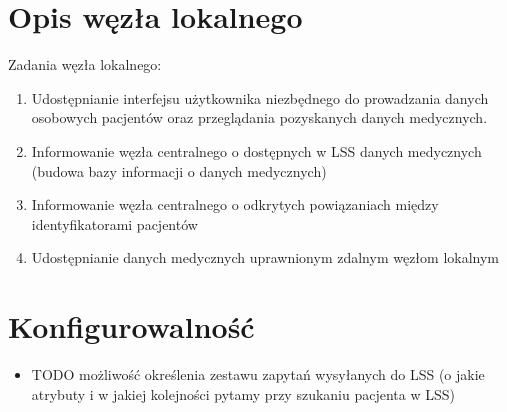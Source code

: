 \documentclass[a4paper]{report}
\begin{document}
\section{Opis węzła lokalnego}
Zadania węzła lokalnego:
  \begin{enumerate}
    \item Udostępnianie interfejsu użytkownika niezbędnego do prowadzania danych osobowych pacjentów
          oraz przeglądania pozyskanych danych medycznych.
    \item Informowanie węzła centralnego o dostępnych w LSS danych medycznych (budowa bazy informacji o danych medycznych)
    \item Informowanie węzła centralnego o odkrytych powiązaniach między identyfikatorami pacjentów
    \item Udostępnianie danych medycznych uprawnionym zdalnym węzłom lokalnym
  \end{enumerate}

\section{Konfigurowalność}

\begin{itemize}
  \item TODO możliwość określenia zestawu zapytań wysyłanych do LSS (o jakie atrybuty i w jakiej kolejności pytamy przy szukaniu pacjenta w LSS)
\end{itemize}
\end{document}
